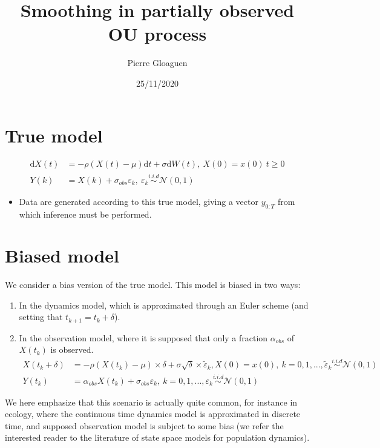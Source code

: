 \documentclass[
]{article}
\title{Smoothing in partially observed OU process}
\author{Pierre Gloaguen}
\date{25/11/2020}
\providecommand{\tightlist}{%
  \setlength{\itemsep}{0pt}\setlength{\parskip}{0pt}}
\begin{document}
\maketitle

\hypertarget{true-model}{%
\section{True model}\label{true-model}}

\begin{align}
\text{d} X(t) &= -\rho(X(t) - \mu) \text{d}t + \sigma \text{d}W(t),~X(0) = x(0)~t\geq 0\\
Y(k) &= X(k) + \sigma_{obs}\varepsilon_k,~ \varepsilon_k \overset{i.i.d}{\sim} \mathcal{N}(0, 1)
\end{align}

\begin{itemize}
\tightlist
\item
  Data are generated according to this true model, giving a vector
  \(y_{0:T}\) from which inference must be performed.
\end{itemize}

\hypertarget{biased-model}{%
\section{Biased model}\label{biased-model}}

We consider a bias version of the true model. This model is biased in
two ways:

\begin{enumerate}
\def\labelenumi{\arabic{enumi}.}
\tightlist
\item
  In the dynamics model, which is approximated through an Euler scheme
  (and setting that \(t_{k + 1} = t_k + \delta\)).
\item
  In the observation model, where it is supposed that only a fraction
  \(\alpha_{obs}\) of \(X(t_k)\) is observed. \begin{align}
  X(t_k + \delta) &= -\rho(X(t_k) - \mu)\times \delta + \sigma\sqrt{\delta} \times \tilde{\varepsilon}_k, X(0) = x(0), ~k =  0, 1,..., \tilde{\varepsilon}_k \overset{i.i.d}{\sim} \mathcal{N}(0, 1)\\
  Y(t_k) &= \alpha_{obs}X(t_k) + \sigma_{obs}\varepsilon_k,~k = 0, 1, ..., \varepsilon_k \overset{i.i.d}{\sim} \mathcal{N}(0, 1)
  \end{align}
\end{enumerate}

We here emphasize that this scenario is actually quite common, for
instance in ecology, where the continuous time dynamics model is
approximated in discrete time, and supposed observation model is subject
to some bias (we refer the interested reader to the literature of state
space models for population dynamics).
\end{document}
